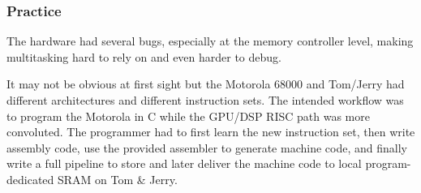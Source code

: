 \subsubsection{Practice}
The hardware had several bugs, especially at the memory controller level, making multitasking hard to rely on and even harder to debug.







It may not be obvious at first sight but the Motorola 68000 and Tom/Jerry had different architectures and different instruction sets. The intended workflow was to program the Motorola in C while the GPU/DSP RISC path was more convoluted. The programmer had to first learn the new instruction set, then write assembly code, use the provided assembler to generate machine code, and finally write a full pipeline to store and later deliver the machine code to local program-dedicated SRAM on Tom \& Jerry.\\
\par











